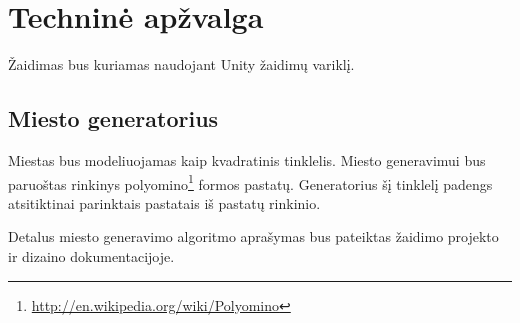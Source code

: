 \section{Techninė apžvalga}

Žaidimas bus kuriamas naudojant Unity žaidimų variklį.

\subsection{Miesto generatorius}

Miestas bus modeliuojamas kaip kvadratinis tinklelis.
Miesto generavimui bus paruoštas rinkinys polyomino\footnote{\url{http://en.wikipedia.org/wiki/Polyomino}} formos pastatų.
Generatorius šį tinklelį padengs atsitiktinai parinktais pastatais iš pastatų rinkinio.

Detalus miesto generavimo algoritmo aprašymas bus pateiktas žaidimo projekto ir dizaino dokumentacijoje.


